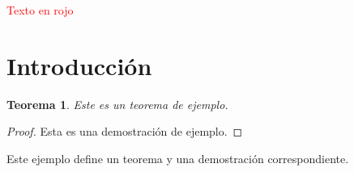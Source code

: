 \documentclass{article}
\begin{document}
\textcolor{red}{Texto en rojo}

\lipsum[1] %
\newtheorem{theorem}{Teorema}[section] %

\section{Introducción}
\begin{theorem}
Este es un teorema de ejemplo.
\end{theorem}
\begin{proof}
Esta es una demostración de ejemplo.
\end{proof}
Este ejemplo define un teorema y una demostración correspondiente.

\end{document}
